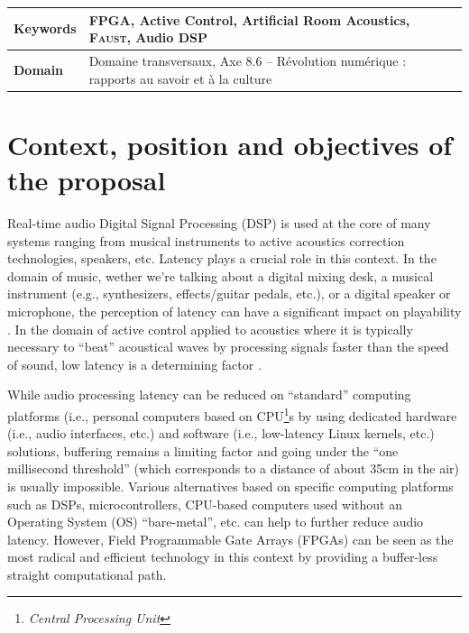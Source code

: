 \documentclass[a4paper,10pt]{article}
\author{Coordinator: Romain Michon\\
\small GRAME-CNCM, Lyon.
}
\title{\vspace{-\baselineskip}\mytitle}
\date{Domaine transversaux\\
Axe 8.6 -- Révolution numérique : rapports au savoir et à la culture}
\newcommand{\F}{\textsc{Faust}}
\begin{document}
\maketitle
\thispagestyle{fancy}



\begin{tabular}{p{2.3cm} p{12cm}}
  \hline
  \textbf{Keywords} & FPGA, Active Control, Artificial Room Acoustics, \F{}, Audio DSP \\\hline
  \textbf{Domain} & Domaine transversaux, Axe 8.6 -- Révolution numérique : rapports au savoir et à la culture
  \\\hline
\end{tabular}

\section*{Context, position and objectives of the proposal}

Real-time audio Digital Signal Processing (DSP) is used at the core of many systems ranging from musical instruments to active acoustics correction technologies, speakers, etc. Latency plays a crucial role in this context.  In the domain of music, wether we're talking about a digital mixing desk, a musical instrument (e.g., synthesizers, effects/guitar pedals, etc.), or a digital speaker or microphone, the perception of latency can have a significant impact on playability \cite{Lago2004}. In the domain of active control applied to acoustics where it is typically necessary to ``beat'' acoustical waves by processing signals faster than the speed of sound, low latency is a determining factor \cite{Zhang2018}.  

While audio processing latency can be reduced on ``standard'' computing platforms (i.e., personal computers based on CPU\footnote{\textit{Central Processing Unit}}s by using dedicated hardware (i.e., audio interfaces, etc.) and software (i.e., low-latency Linux kernels, etc.) solutions, buffering remains a limiting factor and going under the ``one millisecond threshold'' (which corresponds to a distance of about 35cm in the air) is usually impossible. Various alternatives based on specific computing platforms such as DSPs, microcontrollers, CPU-based computers used without an Operating System (OS) ``bare-metal'', etc. can help to further reduce audio latency. However, Field Programmable Gate Arrays (FPGAs) can be seen as the most radical and efficient technology in this context by providing a buffer-less straight computational path. 
\end{document}
